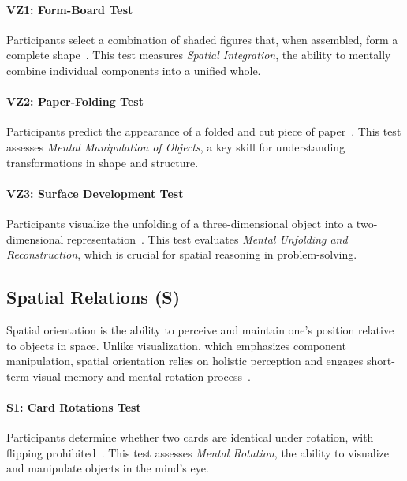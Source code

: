 \paragraph{VZ1: Form-Board Test}

Participants select a combination of shaded figures that, when assembled, form a complete shape~\cite[34]{thurstone1938primary}.
This test measures \textit{Spatial Integration}, the ability to mentally combine individual components into a unified whole.

\paragraph{VZ2: Paper-Folding Test}

Participants predict the appearance of a folded and cut piece of paper~\cite[37-38]{thurstone1938primary}.
This test assesses \textit{Mental Manipulation of Objects}, a key skill for understanding transformations in shape and structure.

\paragraph{VZ3: Surface Development Test}

Participants visualize the unfolding of a three-dimensional object into a two-dimensional representation~\cite[36]{thurstone1938primary}.
This test evaluates \textit{Mental Unfolding and Reconstruction}, which is crucial for spatial reasoning in problem-solving.

\subsection{Spatial Relations (S)}

Spatial orientation is the ability to perceive and maintain one's position relative to objects in space.
Unlike visualization, which emphasizes component manipulation, spatial orientation relies on holistic perception and engages short-term visual memory and mental rotation process~\cite{zimmerman1954hypotheses, werdelin1969nature, werdelin1971relationship}.

\paragraph{S1: Card Rotations Test}

Participants determine whether two cards are identical under rotation, with flipping prohibited~\cite[50]{thurstone1941factorial}.
This test assesses \textit{Mental Rotation}, the ability to visualize and manipulate objects in the mind's eye.

